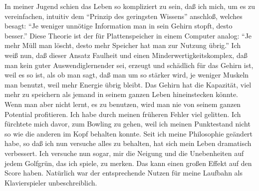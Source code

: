 In meiner Jugend schien das Leben so kompliziert zu sein, daß ich mich, um es zu vereinfachen, intuitiv dem \enquote{Prinzip des geringsten Wissens} anschloß, welches besagt: \enquote{Je weniger unnötige Information man in sein Gehirn stopft, desto besser.}
Diese Theorie ist der für Plattenspeicher in einem Computer analog: \enquote{Je mehr Müll man löscht, desto mehr Speicher hat man zur Nutzung übrig.}
Ich weiß nun, daß dieser Ansatz Faulheit und einen Minderwertigkeitskomplex, daß man kein guter Auswendiglernender sei, erzeugt und schädlich für das Gehirn ist, weil es so ist, als ob man sagt, daß man um so stärker wird, je weniger Muskeln man benutzt, weil mehr Energie übrig bleibt.
Das Gehirn hat die Kapazität, viel mehr zu speichern als jemand in seinem ganzen Leben hineinstecken könnte.
Wenn man aber nicht lernt, es zu benutzen, wird man nie von seinem ganzen Potential profitieren.
Ich habe durch meinen früheren Fehler viel gelitten.
Ich fürchtete mich davor, zum Bowling zu gehen, weil ich meinen Punktestand nicht so wie die anderen im Kopf behalten konnte.
Seit ich meine Philosophie geändert habe, so daß ich nun versuche alles zu behalten, hat sich mein Leben dramatisch verbessert.
Ich versuche nun sogar, mir die Neigung und die Unebenheiten auf jedem Golfgrün, das ich spiele, zu merken.
Das kann einen großen Effekt auf den Score haben.
Natürlich war der entsprechende Nutzen für meine Laufbahn als Klavierspieler unbeschreiblich.


\label{assoziativ}

